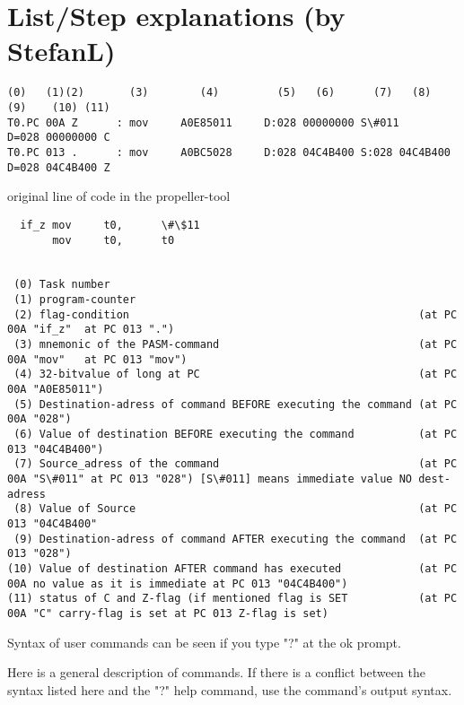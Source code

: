 \documentclass{article}
\numberwithin{equation}{section} %
\begin{document}
\section{List/Step explanations (by StefanL)}

\begin{lstlisting}
(0)   (1)(2)       (3)        (4)         (5)   (6)      (7)   (8)      (9)    (10) (11)
T0.PC 00A Z      : mov     A0E85011     D:028 00000000 S\#011          D=028 00000000 C
T0.PC 013 .      : mov     A0BC5028     D:028 04C4B400 S:028 04C4B400 D=028 04C4B400 Z
\end{lstlisting}


original line of code in the propeller-tool 
\begin{lstlisting}
  if_z mov     t0,      \#\$11
       mov     t0,      t0


 (0) Task number
 (1) program-counter
 (2) flag-condition                                             (at PC 00A "if_z"  at PC 013 ".")
 (3) mnemonic of the PASM-command                               (at PC 00A "mov"   at PC 013 "mov")
 (4) 32-bitvalue of long at PC                                  (at PC 00A "A0E85011")
 (5) Destination-adress of command BEFORE executing the command (at PC 00A "028")
 (6) Value of destination BEFORE executing the command          (at PC 013 "04C4B400")
 (7) Source_adress of the command                               (at PC 00A "S\#011" at PC 013 "028") [S\#011] means immediate value NO dest-adress
 (8) Value of Source                                            (at PC 013 "04C4B400"
 (9) Destination-adress of command AFTER executing the command  (at PC 013 "028")
(10) Value of destination AFTER command has executed            (at PC 00A no value as it is immediate at PC 013 "04C4B400")
(11) status of C and Z-flag (if mentioned flag is SET           (at PC 00A "C" carry-flag is set at PC 013 Z-flag is set)

\end{lstlisting}

Syntax of user commands can be seen if you type "?" at the ok prompt.

Here is a general description of commands. If there is a conflict between
the syntax listed here and the "?" help command, use the command's output syntax.
\end{document}
